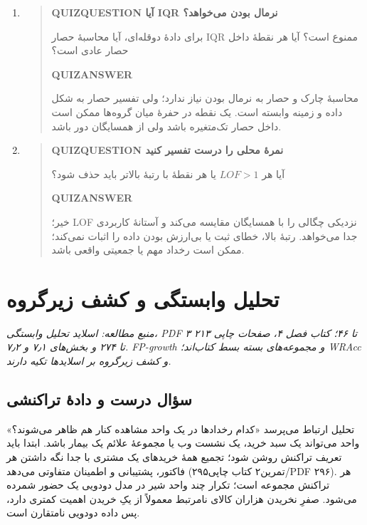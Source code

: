 \begin{enumerate}
\begin{quote}
\end{quote}
\item\begin{quote}\textbf{QUIZQUESTION آیا IQR نرمال بودن می‌خواهد؟}\par 
برای دادهٔ دو‌قله‌ای، آیا محاسبهٔ حصار IQR ممنوع است؟ آیا هر نقطهٔ داخل حصار عادی است؟
\par\textbf{QUIZANSWER}\par محاسبهٔ چارک و حصار به نرمال بودن نیاز ندارد؛ ولی تفسیر حصار به شکل داده و زمینه وابسته است. یک نقطه در حفرهٔ میان گروه‌ها ممکن است داخل حصار تک‌متغیره باشد ولی از همسایگان دور باشد.\par 
\end{quote}
\item\begin{quote}\textbf{QUIZQUESTION نمرهٔ محلی را درست تفسیر کنید}\par 
آیا هر $LOF>1$ یا هر نقطهٔ با رتبهٔ بالاتر باید حذف شود؟
\par\textbf{QUIZANSWER}\par خیر؛ LOF نزدیکی چگالی را با همسایگان مقایسه می‌کند و آستانهٔ کاربردی جدا می‌خواهد. رتبهٔ بالا، خطای ثبت یا بی‌ارزش بودن داده را اثبات نمی‌کند؛ ممکن است رخداد مهم یا جمعیتی واقعی باشد.\par 
\end{quote}
\end{enumerate}


\chapter{تحلیل وابستگی و کشف زیرگروه}
\textit{منبع مطالعه: اسلاید تحلیل وابستگی، PDF ۳ تا ۴۶؛ کتاب فصل ۴، صفحات چاپی ۲۱۳ تا ۲۷۴ و بخش‌های ۷٫۱ و ۷٫۲. FP-growth و مجموعه‌های بسته بسط کتاب‌اند؛ WRAcc و کشف زیرگروه بر اسلایدها تکیه دارند.}\par 
\section{سؤال درست و دادهٔ تراکنشی}

تحلیل ارتباط می‌پرسد «کدام رخدادها در یک واحد مشاهده کنار هم ظاهر می‌شوند؟» واحد می‌تواند یک سبد خرید، یک نشست وب یا مجموعهٔ علائم یک بیمار باشد. ابتدا باید تعریف تراکنش روشن شود؛ تجمیع همهٔ خریدهای یک مشتری با جدا نگه داشتن هر فاکتور، پشتیبانی و اطمینان متفاوتی می‌دهد (تمرین۲ کتاب چاپی۲۹۵/PDF ۲۹۶). هر تراکنش مجموعه است؛ تکرار چند واحد شیر در مدل دودویی یک حضور شمرده می‌شود. صفرِ نخریدن هزاران کالای نامرتبط معمولاً از یکِ خریدن اهمیت کمتری دارد، پس داده دودویی نامتقارن است.

